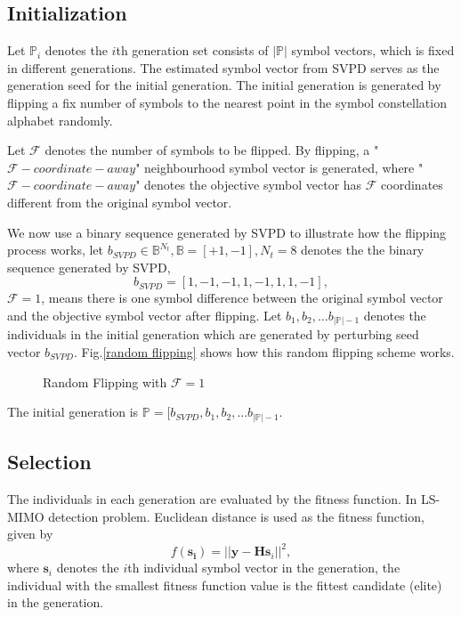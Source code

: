 \subsection{Initialization}
Let $\mathbb{P}_{i}$ denotes the $i$th generation set consists of $|\mathbb{P}|$ symbol vectors, which is fixed in different generations. The estimated symbol vector from SVPD serves as the generation seed for the initial generation. The initial generation is generated by flipping a fix number of symbols to the nearest point in the symbol constellation alphabet randomly.

Let $\mathcal{F}$ denotes the number of symbols to be flipped. By flipping, a "$\mathcal{F}-coordinate-away$" neighbourhood symbol vector is generated, where "$\mathcal{F}-coordinate-away$" denotes the objective symbol vector has $\mathcal{F}$ coordinates different from the original symbol vector.

We now use a binary sequence generated by SVPD to illustrate how the flipping process works, let $b_{SVPD}\in \mathbb{B}^{N_{t}}, \mathbb{B}=[+1, -1], N_{t}=8$ denotes the the binary sequence generated by SVPD, 
\begin{equation}
b_{SVPD}=[1, -1, -1, 1, -1, 1, 1, -1],
\end{equation}  
$\mathcal{F}=1$, means there is one symbol difference between the original symbol vector and the objective symbol vector after flipping. Let $b_{1}, b_{2}, \ldots b_{|\mathbb{P}|-1}$ denotes the individuals in the initial generation which are generated by perturbing seed vector $b_{SVPD}$. Fig.\ref{random flipping} shows how this random flipping scheme works.
\begin{figure}
\centering
\def\svgwidth{\columnwidth}

\caption{Random Flipping with $\mathcal{F}=1$}
\label{random fipping}
\end{figure}
The initial generation is $\mathbb{P}=[b_{SVPD}, b_{1}, b_{2}, \ldots b_{|\mathbb{P}|-1}$.
\subsection{Selection}
The individuals in each generation are evaluated by the fitness function. In LS-MIMO detection problem. Euclidean distance is used as the fitness function, given by 
\begin{equation}
f(\mathbf{s_{i}})=||\mathbf{y}-\mathbf{H}\mathbf{s}_{i}||^{2}, 
\label{fitness function}
\end{equation}
where $\mathbf{s}_{i}$ denotes the $i$th individual symbol vector in the generation, the individual with the smallest fitness function value is the fittest candidate (elite) in the generation.

